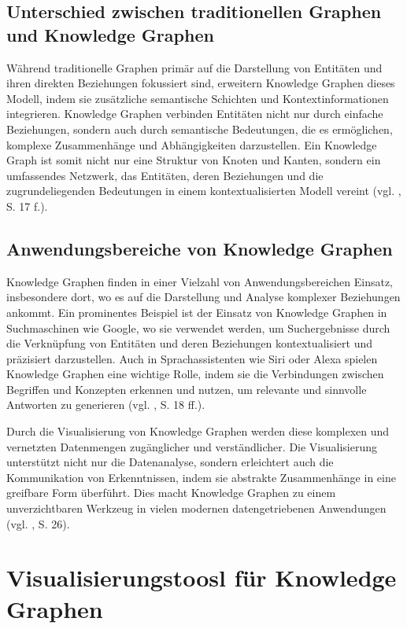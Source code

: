 \subsection{Unterschied zwischen traditionellen Graphen und Knowledge Graphen}

Während traditionelle Graphen primär auf die Darstellung von Entitäten und ihren direkten Beziehungen fokussiert sind, erweitern Knowledge Graphen dieses Modell, indem sie zusätzliche semantische Schichten und Kontextinformationen integrieren. Knowledge Graphen verbinden Entitäten nicht nur durch einfache Beziehungen, sondern auch durch semantische Bedeutungen, die es ermöglichen, komplexe Zusammenhänge und Abhängigkeiten darzustellen. Ein Knowledge Graph ist somit nicht nur eine Struktur von Knoten und Kanten, sondern ein umfassendes Netzwerk, das Entitäten, deren Beziehungen und die zugrundeliegenden Bedeutungen in einem kontextualisierten Modell vereint (vgl. \cite{knowledgeGraphIntroduction:Chaudhri}, S. 17 f.).

\subsection{Anwendungsbereiche von Knowledge Graphen}

Knowledge Graphen finden in einer Vielzahl von Anwendungsbereichen Einsatz, insbesondere dort, wo es auf die Darstellung und Analyse komplexer Beziehungen ankommt. Ein prominentes Beispiel ist der Einsatz von Knowledge Graphen in Suchmaschinen wie Google, wo sie verwendet werden, um Suchergebnisse durch die Verknüpfung von Entitäten und deren Beziehungen kontextualisiert und präzisiert darzustellen. Auch in Sprachassistenten wie Siri oder Alexa spielen Knowledge Graphen eine wichtige Rolle, indem sie die Verbindungen zwischen Begriffen und Konzepten erkennen und nutzen, um relevante und sinnvolle Antworten zu generieren (vgl. \cite{knowledgeGraphIntroduction:Chaudhri}, S. 18 ff.).

Durch die Visualisierung von Knowledge Graphen werden diese komplexen und vernetzten Datenmengen zugänglicher und verständlicher. Die Visualisierung unterstützt nicht nur die Datenanalyse, sondern erleichtert auch die Kommunikation von Erkenntnissen, indem sie abstrakte Zusammenhänge in eine greifbare Form überführt. Dies macht Knowledge Graphen zu einem unverzichtbaren Werkzeug in vielen modernen datengetriebenen Anwendungen (vgl. \cite{knowledgeGraphIntroduction:Chaudhri}, S. 26).

\section{Visualisierungstoosl für Knowledge Graphen}

